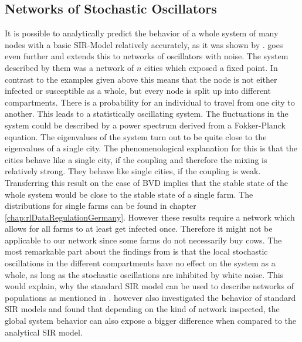 \subsection{Networks of Stochastic Oscillators}
It is possible to analytically predict the behavior of a whole system of many nodes with a basic SIR-Model relatively accurately, as it was shown by \citep{Keeling20051}. \citep{ROZ11} goes even further and extends this to networks of oscillators with noise. The system described by them was a network of $n$ cities which exposed a fixed point. In contrast to the examples given above this means that the node is not either infected or susceptible as a whole, but every node is split up into different compartments. There is a probability for an individual to travel from one city to another. This leads to a statistically oscillating system. The fluctuations in the system could be described by a power spectrum derived from a Fokker-Planck equation. 
The eigenvalues of the system turn out to be quite close to the eigenvalues of a single city. The phenomenological explanation for this is that the cities behave like a single city, if the coupling and therefore the mixing is relatively strong. They behave like single cities, if the coupling is weak. 
Transferring this result on the case of BVD implies that the stable state of the whole system would be close to the stable state of a single farm. The distributions for single farms can be found in chapter \ref{chap:rlDataRegulationGermany}. However these results require a network which allows for all farms to at least get infected once. Therefore it might not be applicable to our network since some farms do not necessarily buy cows. The most remarkable part about the findings from \citep{ROZ11} is that the local stochastic oscillations in the different compartments have no effect on the system as a whole, as long as the stochastic oscillations are inhibited by white noise. This would explain, why the standard SIR model can be used to describe networks of populations as mentioned in \citep{Keeling20051}. \citep{witten2007simulations} however also investigated the behavior of standard SIR models and found that depending on the kind of network inspected, the global system behavior can also expose a bigger difference when compared to the analytical SIR model. 

